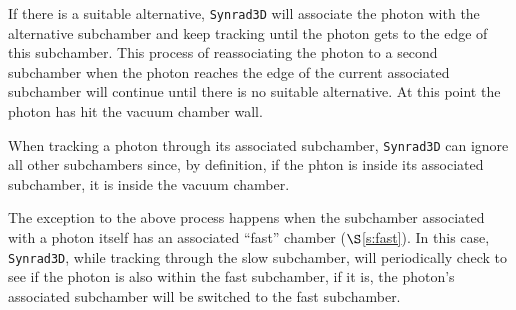 \documentclass[11pt,openany]{report}
\newcommand{\sref}[1]{$\S$\ref{#1}}
\newcommand{\srthree}{\texttt{Synrad3D}\xspace}
\begin{document}
If there is a suitable alternative, \srthree will associate the photon with the
alternative subchamber and keep tracking until the photon gets to the edge of this
subchamber.  This process of reassociating the photon to a second subchamber when the
photon reaches the edge of the current associated subchamber will continue until there is
no suitable alternative. At this point the photon has hit the vacuum chamber wall.

When tracking a photon through its associated subchamber, \srthree can ignore all other
subchambers since, by definition, if the phton is inside its associated subchamber, it
is inside the vacuum chamber.

The exception to the above process happens when the subchamber associated with a photon
itself has an associated ``fast'' chamber (\sref{s:fast}). In this case, \srthree, while
tracking through the slow subchamber, will periodically check to see if the photon is also
within the fast subchamber, if it is, the photon's associated subchamber will be switched
to the fast subchamber.
\end{document}
